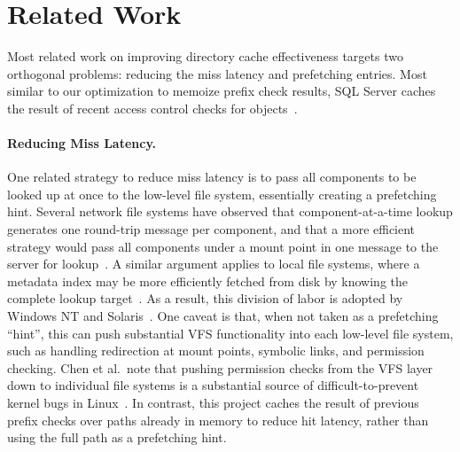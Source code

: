\section{Related Work}
\label{sec:related}

Most related work on improving directory cache effectiveness targets
two orthogonal problems: reducing the miss latency and prefetching entries.
Most similar to our optimization to memoize 
prefix check results, SQL Server  caches the result of recent access control checks 
for objects~\citep{sql-memoize}.



\paragraph{Reducing Miss Latency.}
One related strategy to reduce miss latency is to pass all components to be looked up 
at once to the low-level file system, essentially creating a prefetching hint.
Several network file systems have observed that component-at-a-time lookup 
generates one round-trip message per component, and that a more efficient strategy
would pass all components under a mount point in one message to the server for lookup~\citep{duchamp94nfs,welch94comparison}.
A similar argument applies to local file systems, where a metadata index may be more efficiently fetched from disk
by knowing the complete lookup target~\citep{windowsinternals, lensing13dlfs}.
As a result, this division of labor is adopted by Windows NT and Solaris~\citep{windowsinternals,solarisinternals}.
One caveat is that, when not taken as a prefetching ``hint'', 
this can push substantial VFS functionality into each low-level file system, such as handling redirection at mount points, symbolic links,
and permission checking.
Chen et al.\ note that 
pushing permission checks from the VFS layer down to individual file systems 
is a substantial source of difficult-to-prevent kernel bugs in Linux~\citep{chen11kbugs}.
In contrast, this project caches the result of previous prefix checks over paths already in memory to reduce hit latency,
rather than using the full path as a prefetching hint.


